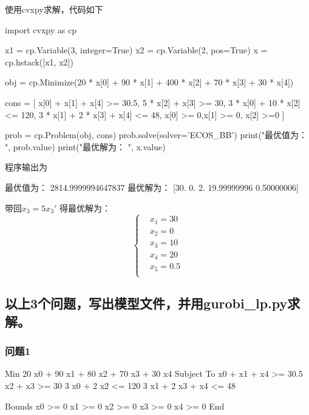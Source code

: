 使用cvxpy求解，代码如下
\begin{python}
    import cvxpy as cp

    x1 = cp.Variable(3, integer=True)
    x2 = cp.Variable(2, pos=True)
    x = cp.hstack([x1, x2])

    obj = cp.Minimize(20 * x[0] + 90 * x[1] + 400 * x[2] + 70 * x[3] + 30 * x[4])

    cons = [
        x[0] + x[1] + x[4] >= 30.5,
        5 * x[2] + x[3] >= 30,
        3 * x[0] + 10 * x[2] <= 120,
        3 * x[1] + 2 * x[3] + x[4] <= 48,
        x[0] >= 0,x[1] >= 0, x[2] >=0
    ]

    prob = cp.Problem(obj, cons)
    prob.solve(solver='ECOS_BB')
    print("最优值为： ", prob.value)
    print("最优解为： ", x.value)
\end{python}

程序输出为

\begin{python}
    最优值为：  2814.9999994647837
    最优解为：  [30.          0.          2.         19.99999996  0.50000006]
\end{python}

带回$x_3 = 5x_3'$
得最优解为：
\begin{equation}
    \left \{
            \begin{aligned}
                & x_1 = 30\\
                & x_2 = 0\\
                & x_3 = 10\\
                & x_4 = 20\\
                & x_5 = 0.5\\
            \end{aligned}
            \right .
\end{equation}

\subsection{以上3个问题，写出模型文件，并用gurobi\_lp.py求解。}

\subsubsection{问题1}

\begin{python}
    Min
    20 x0 + 90 x1 + 80 x2 + 70 x3 + 30 x4
    Subject To
        x0 + x1 + x4 >= 30.5
        x2 + x3 >= 30
        3 x0 + 2 x2 <= 120
        3 x1 + 2 x3 + x4 <= 48

    Bounds
    x0 >= 0
    x1 >= 0
    x2 >= 0
    x3 >= 0
    x4 >= 0
    End
\end{python}

